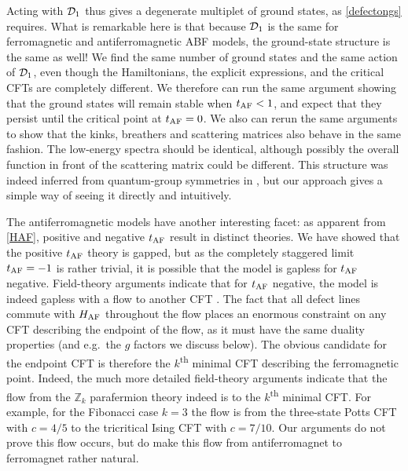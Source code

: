 Acting with $\mathcal{D}_1$ thus gives a degenerate multiplet of ground states, as \eqref{defectongs} requires. What is remarkable here is that because $\mathcal{D}_1$ is the same for ferromagnetic and antiferromagnetic ABF models, the ground-state structure is the same as well! We find the same number of ground states and the same action of $\mathcal{D}_1$, even though the Hamiltonians, the explicit expressions, and the critical CFTs are completely different. We therefore can run the same argument showing that the ground states will remain stable when $t_{\rm AF}<1$, and expect that they persist until the critical point at $t_{\rm AF}=0$. We also can rerun the same arguments to show that the kinks, breathers and scattering matrices also behave in the same fashion. The low-energy spectra should be identical, although possibly the overall function in front of the scattering matrix could be different. This structure was indeed inferred from quantum-group symmetries in \cite{Fateev1990}, but our approach gives a simple way of seeing it directly and intuitively. 

The antiferromagnetic models have another interesting facet: as apparent from \eqref{HAF}, positive and negative $t_{\rm AF}$ result in distinct theories.
We have showed that the positive $t_{\rm AF}$ theory is gapped, but as the completely staggered limit $t_{\rm AF}=-1$ is rather trivial, it is possible that the model is gapless for  $t_{\rm AF}$ negative.
Field-theory arguments  indicate that for $t_{\rm AF}$ negative, the model is indeed gapless with a flow to another CFT \cite{Fateev1991}.
The fact that all defect lines commute with $H_{\rm AF}$ throughout the flow places an enormous constraint on any CFT describing the endpoint of the flow, as it must have the same duality properties (and e.g.\ the $g$ factors we discuss below).
The obvious candidate for the endpoint CFT is therefore the $k$\textsuperscript{th} minimal CFT describing the ferromagnetic point.
Indeed, the much more detailed field-theory arguments  \cite{Fateev1991} indicate that the flow from the $\mathbb{Z}_k$ parafermion theory indeed is to the $k$\textsuperscript{th} minimal CFT.
For example, for the Fibonacci case $k=3$ the flow is from the three-state Potts CFT with $c=4/5$ to the tricritical Ising CFT with $c=7/10$.
Our arguments do not prove this flow occurs, but do make this flow from antiferromagnet to ferromagnet rather natural. 


